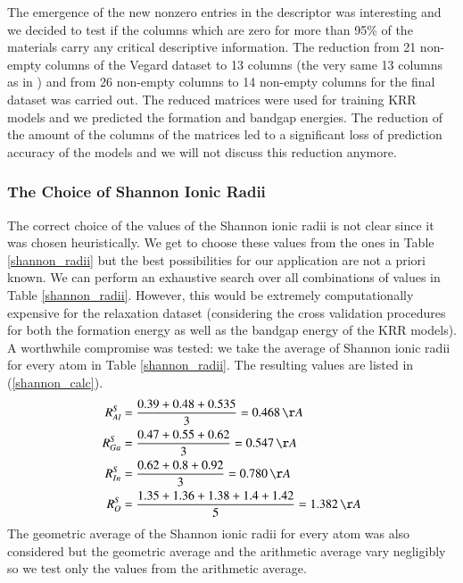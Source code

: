 \documentclass[11pt,oneside,czech,american]{book} %
\theoremstyle{definition} %
\theoremstyle{definition}
\begin{document}
The emergence of the new nonzero entries in the descriptor was interesting and we decided to test if the columns which are zero for more than 95\% of the materials carry any critical descriptive information.
The reduction from 21 non-empty columns of the Vegard dataset to 13 columns (the very same 13 columns as in \parencite{sutton19}) and from 26 non-empty columns to 14 non-empty columns for the final dataset was carried out. The reduced matrices were used for training KRR models and we predicted the formation and bandgap energies. The reduction of the amount of the columns of the matrices led to a significant loss of prediction accuracy of the models and we will not discuss this reduction anymore.
\subsubsection{The Choice of Shannon Ionic Radii}
The correct choice of the values of the Shannon ionic radii is not clear since it was chosen heuristically. We get to choose these values from the ones in Table \ref{shannon_radii} but the best possibilities for our application are not a priori known. We can perform an exhaustive search over all combinations of values in Table \ref{shannon_radii}. However, this would be extremely computationally expensive for the relaxation dataset (considering the cross validation procedures for both the formation energy as well as the bandgap energy of the KRR models). A worthwhile compromise was tested: we take the average of Shannon ionic radii for every atom in Table \ref{shannon_radii}. The resulting values are listed in (\ref{shannon_calc}).
\begin{equation}
	\begin{aligned}
		R^S_{Al} &= \frac{0.39+0.48+0.535}{3} = 0.468 \, \AA\\
		R^S_{Ga} &= \frac{0.47+0.55+0.62}{3} = 0.547 \, \AA\\
		R^S_{In} &= \frac{0.62+0.8+0.92}{3} = 0.780 \, \AA\\
		R^S_O &= \frac{1.35+1.36+1.38+1.4+1.42}{5} = 1.382 \, \AA
	\end{aligned}
\label{shannon_calc}
\end{equation}
The geometric average of the Shannon ionic radii for every atom was also considered but the geometric average and the arithmetic average vary negligibly so we test only the values from the arithmetic average. %
\end{document}
